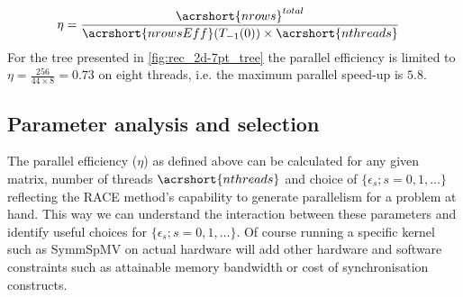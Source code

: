 \begin{align*}
	\eta &= \frac{ \acrshort{nrows}^{total}} {\acrshort{nrowsEff}(T_{-1}(0)) \times \acrshort{nthreads}} 
\end{align*}
For the tree presented in \cref{fig:rec_2d-7pt_tree} the parallel efficiency is limited to $\eta=\frac{256}{44 \times 8 } = 0.73$ on eight threads, i.e. the maximum parallel speed-up is $5.8$.

\subsection{Parameter analysis and selection}

The parallel efficiency ($\eta$) as defined above can be calculated for any given matrix, number of threads $\acrshort{nthreads}$  and choice of $\{\epsilon_s; s=0,1,\ldots\}$ reflecting the RACE method's capability to generate parallelism for a problem at hand. This way we can understand the interaction between these parameters and identify useful choices for $\{\epsilon_s; s=0,1,\ldots\}$. Of course running a specific kernel such as \acrshort{SymmSpMV} on actual hardware will add other hardware and software constraints such as attainable memory bandwidth or cost of synchronisation constructs. 

